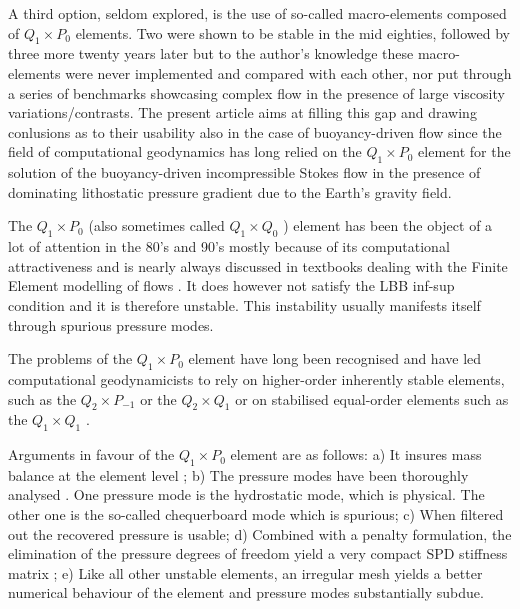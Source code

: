 \documentclass[a4paper]{article}
\begin{document}
A third option, seldom explored, is the use of so-called macro-elements composed of $Q_1\times P_0$ elements. 
Two were shown to be stable in the mid eighties\cite{leta81,sten84}, followed by three more twenty years
later\cite{qizh07} but to the author's knowledge these macro-elements were never 
implemented and compared with each other, nor put through a series of benchmarks showcasing complex flow in the 
presence of large viscosity variations/contrasts. The present article aims at 
filling this gap and drawing conlusions as to their usability also in the case of buoyancy-driven flow
since the field of computational geodynamics has long relied on the $Q_1\times P_0$ element for the 
solution of the buoyancy-driven incompressible Stokes flow in the presence of 
dominating lithostatic pressure gradient due to the Earth's gravity field.  




The $Q_1\times P_0$ (also sometimes called 
$Q_1 \times Q_0$ \cite{grsa}) element has been the object of a lot of attention in the 80's and 90's
mostly because of its computational attractiveness and is nearly always discussed in 
textbooks dealing with the Finite Element modelling of flows \cite{grsa,dohu03,bobf08,bobf13}.
It does however not satisfy the LBB inf-sup condition and it is therefore unstable. 
This instability usually manifests itself through spurious pressure modes.

The problems of the $Q_1\times P_0$ element have long been recognised 
and have led computational geodynamicists to rely on 
higher-order inherently stable elements, such as the $Q_2\times P_{-1}$ \cite{mabl15} or the 
$Q_2\times Q_1$ \cite{krhb12} or on stabilised equal-order elements such as the $Q_1\times Q_1$ \cite{busa13}.

Arguments in favour of the $Q_1\times P_0$ element are as follows:
a) It insures mass balance at the element level \cite[p459]{grsa};
b) The pressure modes have been thoroughly analysed \cite{sagl81a,sagl81b,grsi94}.
One pressure mode is the hydrostatic mode, which is  
physical. The other one is the so-called chequerboard mode which is spurious;
c) When filtered out \cite{chpc95} the recovered pressure is usable;
d) Combined with a penalty formulation, the elimination of the pressure degrees of freedom 
yield a very compact SPD stiffness matrix \cite{zigo75,hulb79,zina82,redd82,odks82};
e) Like all other unstable elements, an irregular mesh yields a 
better numerical behaviour of the element \cite{qizh07} and pressure modes substantially subdue.
\end{document}
